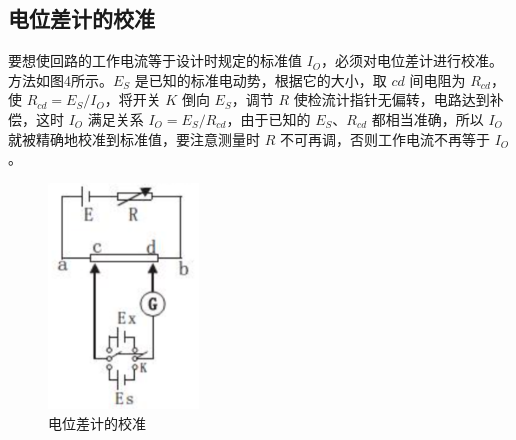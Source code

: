 \documentclass{article}
\begin{document}
\subsection{电位差计的校准}
\hspace*{2em}要想使回路的工作电流等于设计时规定的标准值 \(I_O\)，必须对电位差计进行校准。方法如图4所示。\(E_S\) 是已知的标准电动势，根据它的大小，取 \(cd\) 间电阻为 \(R_{cd}\)，使 \(R_{cd} = E_S/I_O\)，将开关 \(K\) 倒向 \(E_S\)，调节 \(R\) 使检流计指针无偏转，电路达到补偿，这时 \(I_O\) 满足关系 \(I_O = E_S/R_{cd}\)，由于已知的 \(E_S\)、\(R_{cd}\) 都相当准确，所以 \(I_O\) 就被精确地校准到标准值，要注意测量时 \(R\) 不可再调，否则工作电流不再等于 \(I_O\)。\\
\begin{figure}[ht]
    \centering
    \includegraphics[width=4cm]{2.3.png} %
    \caption{电位差计的校准}
\end{figure}\\
\end{document}
